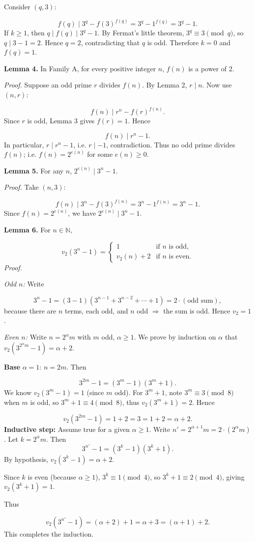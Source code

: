 Consider \((q,3)\):\par
\[
f(q)\mid 3^{q}-f(3)^{f(q)}=3^{q}-1^{f(q)}=3^{q}-1.
\]
If \(k\ge1\), then \(q\mid f(q)\mid 3^{q}-1\). By Fermat's little theorem, \(3^{q}\equiv3\pmod q\), so \(q\mid 3-1=2\). Hence \(q=2\), contradicting that \(q\) is odd. Therefore \(k=0\) and \(f(q)=1\).\par
\textbf{Lemma 4.} In Family A, for every positive integer \(n\), \(f(n)\) is a power of 2.\par
\emph{Proof.} Suppose an odd prime \(r\) divides \(f(n)\). By Lemma 2, \(r\mid n\). Now use \((n,r)\):\par
\[
f(n)\mid r^{n}-f(r)^{f(n)}.
\]
Since \(r\) is odd, Lemma 3 gives \(f(r)=1\). Hence\par
\[
f(n)\mid r^{n}-1.
\]
In particular, \(r\mid r^{n}-1\), i.e. \(r\mid -1\), contradiction. Thus no odd prime divides \(f(n)\); i.e. \(f(n)=2^{e(n)}\) for some \(e(n)\ge0\).\par
\textbf{Lemma 5.} For any \(n\), \(2^{e(n)}\mid 3^{n}-1\).\par
\emph{Proof.} Take \((n,3)\):\par
\[
f(n)\mid 3^{n}-f(3)^{f(n)}=3^{n}-1^{f(n)}=3^{n}-1.
\]
Since \(f(n)=2^{e(n)}\), we have \(2^{e(n)}\mid 3^{n}-1\).\par
\textbf{Lemma 6.} For \(n\in\mathbb N\),\par
\[
v_{2}(3^{n}-1)=\begin{cases}
1 & \text{if } n \text{ is odd},\\
v_{2}(n)+2 & \text{if } n \text{ is even}.
\end{cases}
\]
\emph{Proof.}\par
\emph{Odd \(n\):} Write\par
\[
3^{n}-1=(3-1)(3^{n-1}+3^{n-2}+\cdots+1)=2\cdot(\text{odd sum}),
\]
because there are \(n\) terms, each odd, and \(n\) odd $\Rightarrow$ the sum is odd. Hence \(v_{2}=1\).\par
\emph{Even \(n\):} Write \(n=2^{\alpha}m\) with \(m\) odd, \(\alpha\ge1\). We prove by induction on \(\alpha\) that \(v_{2}(3^{2^{\alpha}m}-1)=\alpha+2\).\par
\textbf{Base }\(\alpha=1\):\textbf{ }\(n=2m\). Then\par
\[
3^{2m}-1=(3^{m}-1)(3^{m}+1).
\]
We know \(v_{2}(3^{m}-1)=1\) (since \(m\) odd). For \(3^{m}+1\), note \(3^{m}\equiv 3\pmod 8\) when \(m\) is odd, so \(3^{m}+1\equiv 4\pmod 8\), thus \(v_{2}(3^{m}+1)=2\). Hence\par
\[
v_{2}(3^{2m}-1)=1+2=3=1+2=\alpha+2.
\]
\textbf{Inductive step:} Assume true for a given \(\alpha\ge1\). Write \(n'=2^{\alpha+1}m = 2\cdot(2^{\alpha}m)\). Let \(k=2^{\alpha}m\). Then
\[
3^{n'}-1=(3^{k}-1)(3^{k}+1).
\]
By hypothesis, \(v_{2}(3^{k}-1)=\alpha+2\).\par
Since \(k\) is even (because \(\alpha\ge1\)), \(3^{k}\equiv 1\pmod 4\), so \(3^{k}+1\equiv 2\pmod 4\), giving \(v_{2}(3^{k}+1)=1\).\par
Thus\par
\[
v_{2}(3^{n'}-1)=(\alpha+2)+1=\alpha+3=(\alpha+1)+2.
\]
This completes the induction.

